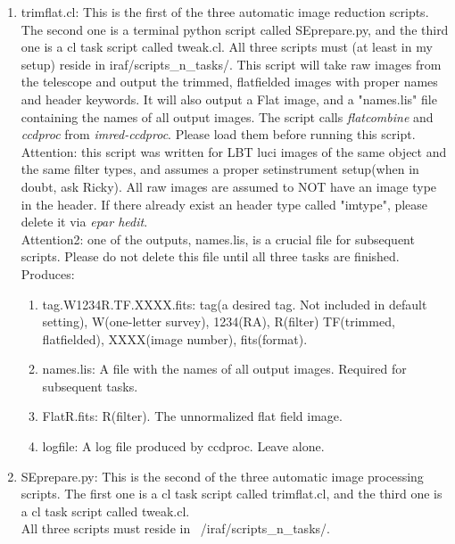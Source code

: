 \documentclass{article}
\begin{document}
\begin{enumerate}
\begin{enumerate}
\item trimflat.cl: This is the first of the three automatic image reduction scripts. The second one is a terminal python script called SEprepare.py, and the third one is a cl task script called tweak.cl. All three scripts must (at least in my setup) reside in iraf/scripts\_n\_tasks/. This script will take raw images from the telescope and output the trimmed, flatfielded images with proper names and header keywords. It will also output a Flat image, and a "names.lis" file containing the names of all output images. The script calls \emph{flatcombine} and \emph{ccdproc} from \emph{imred-ccdproc}. Please load them before running this script.\\

Attention: this script was written for LBT luci images of the same object and the same filter types, and assumes a proper setinstrument setup(when in doubt,  ask Ricky). All raw images are assumed to NOT have an image type in the header. If there already exist an header type called "imtype", please delete it via \emph{epar hedit}.\\

Attention2: one of the outputs, names.lis, is a crucial file for subsequent scripts. Please do not delete this file until all three tasks are finished.\\

Produces: \begin{enumerate}
\item tag.W1234R.TF.XXXX.fits: tag(a desired tag. Not included in default setting), W(one-letter survey), 1234(RA), R(filter) TF(trimmed, flatfielded), XXXX(image number), fits(format).\\
\item names.lis: A file with the names of all output images. Required for subsequent tasks.\\
\item FlatR.fits: R(filter). The unnormalized flat field image. \\
\item logfile: A log file produced by ccdproc. Leave alone.
\end{enumerate}
\item SEprepare.py: This is the second of the three automatic image processing scripts. The first one is a cl task script called trimflat.cl, and the third one is a cl task script called tweak.cl.\\

All three scripts must reside in ~/iraf/scripts\_n\_tasks/.\\


\end{enumerate}
\end{enumerate}
\end{document}

